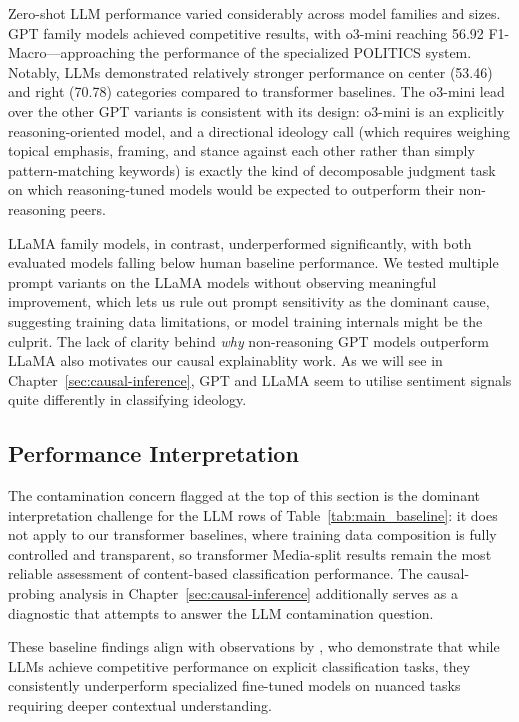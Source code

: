Zero-shot LLM performance varied considerably across model families and sizes. GPT family models achieved competitive results, with o3-mini reaching 56.92 F1-Macro—approaching the performance of the specialized POLITICS system. Notably, LLMs demonstrated relatively stronger performance on center (53.46) and right (70.78) categories compared to transformer baselines. The o3-mini lead over the other GPT variants is consistent with its design: o3-mini is an explicitly reasoning-oriented model, and a directional ideology call (which requires weighing topical emphasis, framing, and stance against each other rather than simply pattern-matching keywords) is exactly the kind of decomposable judgment task on which reasoning-tuned models would be expected to outperform their non-reasoning peers.

LLaMA family models, in contrast, underperformed significantly, with both evaluated models falling below human baseline performance. We tested multiple prompt variants on the LLaMA models without observing meaningful improvement, which lets us rule out prompt sensitivity as the dominant cause, suggesting training data limitations, or model training internals might be the culprit. The lack of clarity behind \textit{why} non-reasoning GPT models outperform LLaMA also motivates our causal explainablity work. As we will see in Chapter~\ref{sec:causal-inference}, GPT and LLaMA seem to utilise sentiment signals quite differently in classifying ideology.

\subsection{Performance Interpretation}

The contamination concern flagged at the top of this section is the dominant interpretation challenge for the LLM rows of Table~\ref{tab:main_baseline}: it does not apply to our transformer baselines, where training data composition is fully controlled and transparent, so transformer Media-split results remain the most reliable assessment of content-based classification performance. The causal-probing analysis in Chapter~\ref{sec:causal-inference} additionally serves as a diagnostic that attempts to answer the LLM contamination question.

These baseline findings align with observations by \citet{Wen_2023}, who demonstrate that while LLMs achieve competitive performance on explicit classification tasks, they consistently underperform specialized fine-tuned models on nuanced tasks requiring deeper contextual understanding.

